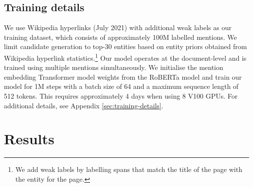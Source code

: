 \documentclass[11pt]{article}
\begin{document}
\subsection{Training details}
We use Wikipedia hyperlinks (July 2021) with additional weak labels as our training dataset, which consists of approximately 100M labelled mentions. We limit candidate generation to top-30 entities based on entity priors obtained from Wikipedia hyperlink statistics.\footnote{We add weak labels by labelling spans that match the title of the page with the entity for the page.} Our model operates at the document-level and is trained using multiple mentions simultaneously. We initialise the mention embedding Transformer model weights from the RoBERTa \cite{roberta} model and train our model for 1M steps with a batch size of 64 and a maximum sequence length of 512 tokens. This requires approximately 4 days when using 8 V100 GPUs. For additional details, see Appendix \ref{sec:training-details}.

\section{Results}
\end{document}
